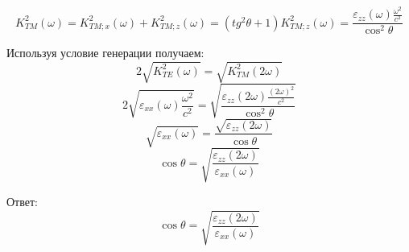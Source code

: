 \documentclass[12pt]{article}
\begin{document}
\begin{large}
\[
    K_{TM}^2 ( \omega ) = K_{TM; x}^2 ( \omega ) + K_{TM; z}^2 ( \omega ) = \left( tg^2 \theta + 1 \right) K_{TM; z}^2 ( \omega ) = \frac{\varepsilon_{zz} ( \omega ) \frac{ \omega^2 }{c^2}}{ \cos^2 \theta }
\]
\par Используя условие генерации получаем:
\[
    2 \sqrt{K_{TE}^2 ( \omega )} = \sqrt{K_{TM}^2 ( 2 \omega )}
\]
\[
    2 \sqrt{ \varepsilon_{xx} ( \omega ) \frac{ \omega^2 }{c^2} } = \sqrt{ \frac{\varepsilon_{zz} ( 2 \omega ) \frac{ ( 2 \omega )^2 }{c^2}}{ \cos^2 \theta } }
\]
\[
    \sqrt{\varepsilon_{xx} ( \omega )} = \frac{\sqrt{\varepsilon_{zz} (2 \omega )}}{ \cos \theta }
\]
\[
    \cos \theta = \sqrt{\frac{\varepsilon_{zz} (2 \omega )}{\varepsilon_{xx} ( \omega )}}
\]
\par Ответ:
\[
    \cos \theta = \sqrt{\frac{\varepsilon_{zz} (2 \omega )}{\varepsilon_{xx} ( \omega )}}
\]
\par
\par
\end{large}
\end{document}
